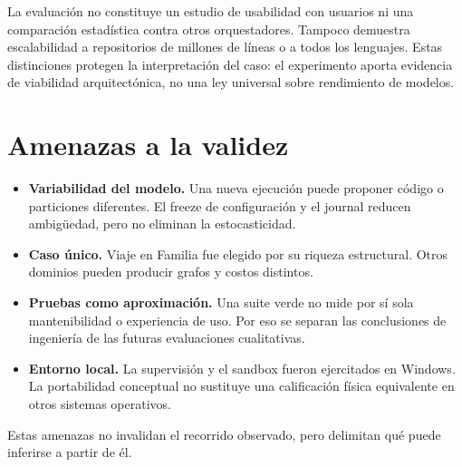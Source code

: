 La evaluación no constituye un estudio de usabilidad con usuarios ni una
comparación estadística contra otros orquestadores. Tampoco demuestra
escalabilidad a repositorios de millones de líneas o a todos los lenguajes. Estas
distinciones protegen la interpretación del caso: el experimento aporta
evidencia de viabilidad arquitectónica, no una ley universal sobre rendimiento
de modelos.

\section{Amenazas a la validez}

\begin{itemize}
  \item \textbf{Variabilidad del modelo.} Una nueva ejecución puede proponer
  código o particiones diferentes. El freeze de configuración y el journal
  reducen ambigüedad, pero no eliminan la estocasticidad.
  \item \textbf{Caso único.} Viaje en Familia fue elegido por su riqueza
  estructural. Otros dominios pueden producir grafos y costos distintos.
  \item \textbf{Pruebas como aproximación.} Una suite verde no mide por sí sola
  mantenibilidad o experiencia de uso. Por eso se separan las conclusiones de
  ingeniería de las futuras evaluaciones cualitativas.
  \item \textbf{Entorno local.} La supervisión y el sandbox fueron ejercitados
  en Windows. La portabilidad conceptual no sustituye una calificación física
  equivalente en otros sistemas operativos.
\end{itemize}

Estas amenazas no invalidan el recorrido observado, pero delimitan qué puede
inferirse a partir de él.
